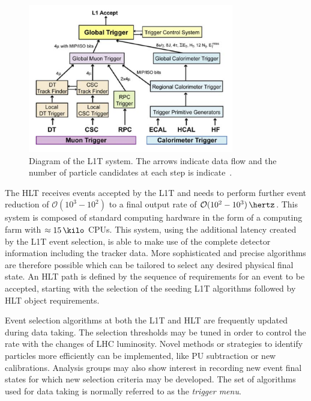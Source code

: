 \begin{figure}[!htb]
  \centering
  \includegraphics[width=0.80\textwidth]{Chapter02/CMS/Images/CMS_L1T_Layout.png}
  \caption[Diagram of the L1T system and its data flow.]
  {Diagram of the \gls{L1T} system. The arrows indicate data flow and the number of particle candidates at each step is indicate~\cite{ARTICLE:TheCMSExperiment}.}
  \label{FIGURE:ExperimentalApparatus_CMS_L1T_Layout}
\end{figure}

The \gls{HLT} receives events accepted by the \gls{L1T} and needs to perform further event reduction of 
$\mathcal{O}(10^{3}-10^{2})$ to a final output rate of $\mathcal{O}(10^{2}-10^{3})\,\hertz$. This system is composed of standard computing hardware in the form of a computing farm with $\approx 15\,\kilo$ \glspl{CPU}. This system, using the additional latency created by the \gls{L1T} event selection, is able to make use of the complete detector information including the tracker data. More sophisticated and precise algorithms are therefore possible which can be tailored to select any desired physical final state. An \gls{HLT} path is defined by the sequence of requirements for an event to be accepted, starting with the selection of the seeding \gls{L1T} algorithms followed by \gls{HLT} object requirements.

Event selection algorithms at both the \gls{L1T} and \gls{HLT} are frequently updated during data taking. The selection thresholds may be tuned in order to control the rate with the changes of \gls{LHC} luminosity. Novel methods or strategies to identify particles more efficiently can be implemented, like \gls{PU} subtraction or new calibrations. Analysis groups may also show interest in recording new event final states for which new selection criteria may be developed. The set of algorithms used for data taking is normally referred to as the \textit{trigger menu}. 

